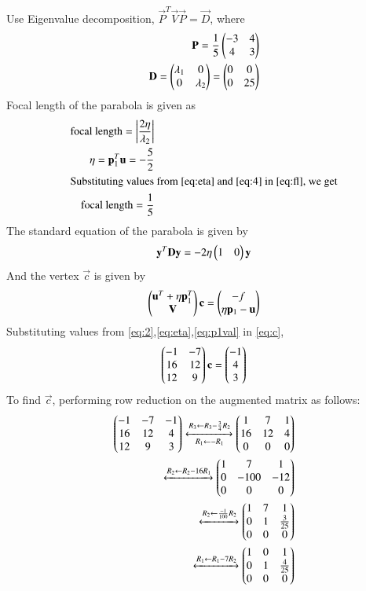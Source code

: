 \documentclass[journal,12pt,twocolumn]{IEEEtran}
\begin{document}
Use Eigenvalue decomposition, $\vec{P}^T\vec{V}\vec{P}=\vec{D}$, where
\begin{align}
    \mathbf{P} = \frac{1}{5}\begin{pmatrix}-3 & 4\\4 & 3\end{pmatrix}\\
    \mathbf{D} = \begin{pmatrix}\lambda_1 & 0\\0 & \lambda_2\end{pmatrix} = \begin{pmatrix}0 & 0\\ 0 & 25\end{pmatrix}
\end{align}
Focal length of the parabola is given as
\begin{align}
    \text{focal length} = \left\vert\frac{2\eta}{\lambda_2}\right\vert\label{eq:fl}\\
    \eta = \mathbf{p}_1^T\mathbf{u} = -\frac{5}{2}\label{eq:eta}\\
    \intertext{Substituting values from \eqref{eq:eta} and \eqref{eq:4} in \eqref{eq:fl}, we get}
    \text{focal length} = \frac{1}{5}
\end{align}
The standard equation of the parabola is given by
\begin{align}
    \mathbf{y}^T\mathbf{D}\mathbf{y} = -2\eta\begin{pmatrix}1 & 0\end{pmatrix}\mathbf{y}
\end{align}
And the vertex $\vec{c}$ is given by
\begin{align}
    \begin{pmatrix}\mathbf{u}^T + \eta\mathbf{p}_1^T \\ \mathbf{V}\end{pmatrix}\mathbf{c} = \begin{pmatrix}-f \\ \eta\mathbf{p}_1 - \mathbf{u}\end{pmatrix} \label{eq:c}
\end{align}
Substituting values from \eqref{eq:2},\eqref{eq:eta},\eqref{eq:p1val} in \eqref{eq:c},
\begin{align}
    \begin{pmatrix}-1 & -7\\16 & 12\\12 & 9\end{pmatrix}\mathbf{c} = \begin{pmatrix}-1\\4\\3\end{pmatrix}
\end{align}
To find $\vec{c}$, performing row reduction on the augmented matrix as follows:
\begin{align}
    \begin{pmatrix}-1 & -7 & -1\\16 & 12 & 4\\12 & 9 & 3\end{pmatrix}\xleftrightarrow[R_1\leftarrow -R_1]{R_3\leftarrow R_3-\frac{3}{4}R_2}\begin{pmatrix}1 & 7 & 1\\16 & 12 & 4\\0&0&0\end{pmatrix}\\
    \xleftrightarrow{R_2\leftarrow R_2-16R_1}\begin{pmatrix}1 & 7 & 1\\0 & -100 & -12\\0&0&0\end{pmatrix}\\\xleftrightarrow{R_2\leftarrow \frac{-1}{100}R_2}\begin{pmatrix}1 & 7 & 1\\0 & 1 & \frac{3}{25}\\0&0&0\end{pmatrix}\\\xleftrightarrow{R_1\leftarrow R_1-7R_2}\begin{pmatrix}1 & 0 & 1\\0 & 1 & \frac{4}{25}\\0&0&0\end{pmatrix}
\end{align}
\end{document}
